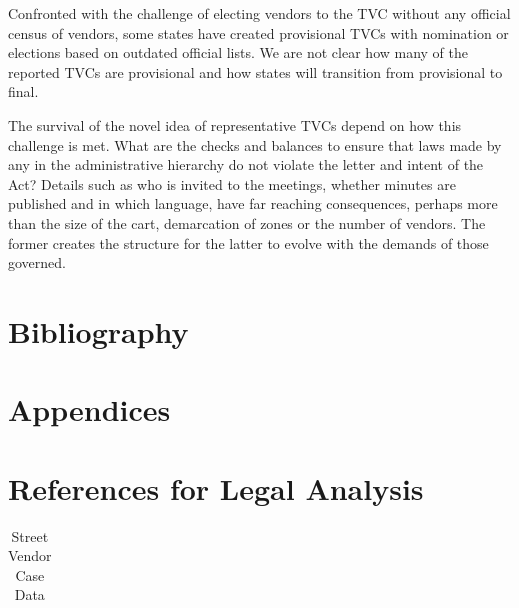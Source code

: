 \documentclass[a4paper, 12pt, twoside]{article}
\begin{document}
{{Confronted with the challenge of electing vendors to the TVC without any official census of vendors, some states have created provisional TVCs with nomination or elections based on outdated official lists. We are not clear how many of the reported TVCs are provisional and how states will transition from provisional to final. 

The survival of the novel idea of representative TVCs depend on how this challenge is met. What are the checks and balances to ensure that laws made by any in the administrative hierarchy do not violate the letter and intent of the Act? Details such as who is invited to the meetings, whether minutes are published and in which language, have far reaching consequences, perhaps more than the size of the cart, demarcation of zones or the number of vendors. The former creates the structure for the latter to evolve with the demands of those governed.


\newpage
\section*{Bibliography}
\printbibliography[heading=none]

           
\newpage
\appendix
\begin{landscape} 
\section*{Appendices}

\section{References for Legal Analysis}
\label{appendix: court cases}
            \scriptsize
            \begin{longtable}{>{\raggedright}p{1.5cm}>{\raggedright}p{2.5cm}>{\raggedright}p{1.3cm}>{\raggedright}p{1.5cm}>{\raggedright}p{1.1cm}>{\raggedright}p{1.2cm}>{\raggedright}p{1cm}>{\raggedright}p{1.8cm}>{\raggedright}p{1.3cm}>{\raggedright}p{4.45cm}>{\raggedright\arraybackslash}p{1.2cm}}
          
            \caption{Street Vendor Case Data}\\


\end{longtable}
\end{landscape}}}
\end{document}
